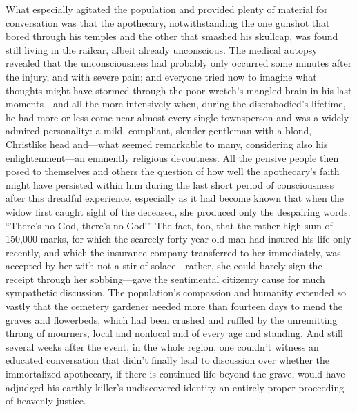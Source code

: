 \documentclass[12pt,a4paper]{article}
\begin{document}
What especially agitated the population and provided plenty of material for conversation was that the  apothecary, notwithstanding the one gunshot that bored through his temples and the other that smashed his skullcap, was found still living in the railcar, albeit already unconscious. The medical autopsy revealed that the unconsciousness had probably only occurred some minutes after the injury, and with severe pain; and everyone tried now to imagine what thoughts might have stormed through the poor wretch’s mangled brain in his last moments—and all the more intensively when, during the disembodied’s lifetime, he had more or less come near almost every single townsperson and was a widely admired personality: a mild, compliant, slender gentleman with a blond, Christlike head and—what seemed remarkable to many, considering also his enlightenment—an eminently religious devoutness. All the pensive people then posed to themselves and others the question of how well the apothecary’s faith might have persisted within him during the last short period of consciousness after this dreadful experience, especially as it had become known that when the widow first caught sight of the deceased, she produced only the despairing words: “There’s no God, there’s no God!” The fact, too, that the rather high sum of 150,000 marks, for which the scarcely forty-year-old man had insured his life only recently, and which the insurance company transferred to her immediately, was accepted by her with not a stir of solace—rather, she could barely sign the receipt through her sobbing—gave the sentimental citizenry cause for much sympathetic discussion. The population’s compassion and humanity extended so vastly that the cemetery gardener needed more than fourteen days to mend the graves and flowerbeds, which had been crushed and ruffled by the unremitting throng of mourners, local and nonlocal and of every age and standing. And still several weeks after the event, in the whole region, one couldn’t witness an educated conversation that didn’t finally lead to discussion over whether the immortalized apothecary, if there is continued life beyond the grave, would have adjudged his earthly killer’s undiscovered identity an entirely proper proceeding of heavenly justice.
\end{document}
